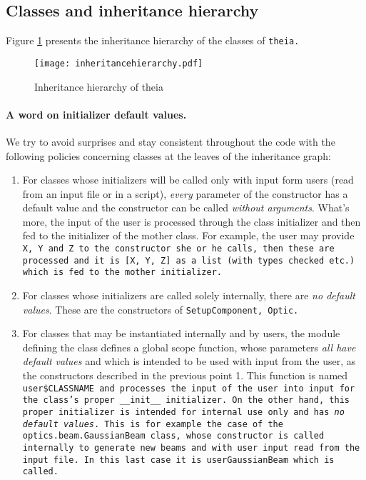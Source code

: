 \documentclass{article}
\begin{document}
\subsection{Classes and inheritance hierarchy}
Figure \ref{inheritancehierarchy} presents the inheritance hierarchy of the classes of \tt{theia}.

\begin{figure}[h]
\begin{center}
\texttt{[image: inheritancehierarchy.pdf]}
\caption{Inheritance hierarchy of theia}
\label{inheritancehierarchy}
\end{center}
\end{figure}
\paragraph{A word on initializer default values.}We try to avoid surprises and stay consistent throughout the code with the following policies concerning classes at the leaves of the inheritance graph:

\begin{enumerate}
\item For classes whose initializers will be called only with input form users (read from an input file or in a script), \textit{every} parameter of the constructor has a default value and the constructor can be called \textit{without arguments}. What's more, the input of the user is processed through the class initializer and then fed to the initializer of the mother class. For example, the user may provide \tt{X}, \tt{Y} and \tt{Z} to the constructor she or he calls, then these are processed and it is \tt{[X, Y, Z]} as a list (with types checked etc.) which is fed to the mother initializer.

\item For classes whose initializers are called solely internally, there are \textit{no default values}. These are the constructors of \tt{SetupComponent}, \tt{Optic}.

\item For classes that may be instantiated internally and by users, the module defining the class defines a global scope function, whose parameters \textit{all have default values} and which is intended to be used with input from the user, as the constructors described in the previous point 1. This function is named \tt{user\$CLASSNAME} and processes the input of the user into input for the class's proper \tt{\_\_init\_\_} initializer. On the other hand, this proper initializer is intended for internal use only and has \textit{no default values}. This is for example the case of the \tt{optics.beam.GaussianBeam} class, whose constructor is called internally to generate new beams and with user input read from the input file. In this last case it is \tt{userGaussianBeam} which is called.
\end{enumerate}
\end{document}
